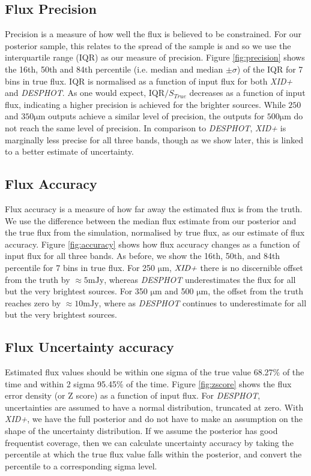 \documentclass[useAMS,usenatbib]{mnras}
\begin{document}
\subsection{Flux Precision}
Precision is a measure of how well the flux is believed to be constrained. For our posterior sample, this relates to the spread of the sample is and so we use the interquartile range (IQR) as our measure of precision. Figure \ref{fig:precision} shows the 16th, 50th and 84th percentile (i.e. median and median $\pm \sigma$) of the IQR for 7 bins in true flux. IQR is normalised as a function of input flux for both \emph{XID+} and \emph{DESPHOT}. As one would expect, $\mathrm{IQR}/S_{True}$ decreases as a function of input flux, indicating a higher precision is achieved for the brighter sources. While $250$ and $350\mathrm{\mu m}$ outputs achieve a similar level of precision, the outputs for $500 \mathrm{\mu m}$ do not reach the same level of precision. In comparison to \emph{DESPHOT}, \emph{XID+} is marginally less precise for all three bands, though as we show later, this is linked to a better estimate of uncertainty. 

\subsection{Flux Accuracy}
Flux accuracy is a measure of how far away the estimated flux is from the truth. We use the difference between the median flux estimate from our posterior and the true flux from the simulation, normalised by true flux, as our estimate of flux accuracy. Figure \ref{fig:accuracy} shows how flux accuracy changes as a function of input flux for all three bands. As before, we show the 16th, 50th, and 84th percentile for 7 bins in true flux. For 250 $\mathrm{\mu m}$, $\emph{XID+}$ there is no discernible offset from the truth by $\approx 5 \mathrm{mJy}$, whereas \emph{DESPHOT} underestimates the flux for all but the very brightest sources. For 350 $\mathrm{\mu m}$ and 500 $\mathrm{\mu m}$, the offset from the truth reaches zero by $\approx10 \mathrm{mJy}$, where as \emph{DESPHOT} continues to underestimate for all but the very brightest sources.

\subsection{Flux Uncertainty accuracy}
Estimated flux values should be within one sigma of the true value 68.27\% of the time and within 2 sigma 95.45\% of the time. Figure \ref{fig:zscore} shows the flux error density (or Z score) as a function of input flux. For \emph{DESPHOT}, uncertainties are assumed to have a normal distribution, truncated at zero. With \emph{XID+}, we have the full posterior and do not have to make an assumption on the shape of the uncertainty distribution. If we assume the posterior has good frequentist coverage, then we can calculate uncertainty accuracy by taking the percentile at which the true flux value falls within the posterior, and convert the percentile to a corresponding sigma level.
\end{document}
